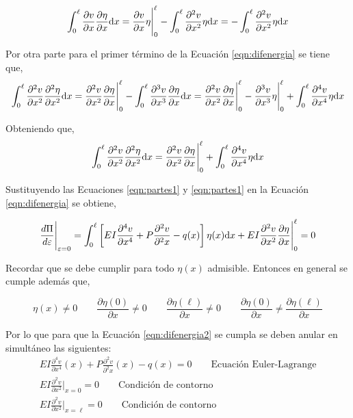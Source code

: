 \begin{equation}\label{eqn:partes1}
\int_0^\ell \frac{\partial v}{\partial x} \frac{\partial \eta}{\partial x}{\text{d}} x = \frac{\partial v}{\partial x}\eta\Bigg|_0^\ell - \int_0^\ell \frac{\partial^2 v}{\partial x^2} \eta{\text{d}} x 
= -\int_0^\ell \frac{\partial^2 v}{\partial x^2} \eta{\text{d}} x
\end{equation}

Por otra parte para el primer término de la Ecuación \eqref{eqn:difenergia} se tiene que,
$$
\int_0^\ell \frac{\partial^2 v}{\partial x^2} \frac{\partial^2 \eta}{\partial x^2}{\text{d}} x = \frac{\partial^2 v}{\partial x^2} \frac{\partial \eta}{\partial x}\Bigg|_0^\ell - \int_0^\ell \frac{\partial^3 v}{\partial x^3} \frac{\partial \eta}{\partial x}{\text{d}} x = \frac{\partial^2 v}{\partial x^2} \frac{\partial \eta}{\partial x}\Bigg|_0^\ell - \frac{\partial^3 v}{\partial x^3}\eta\Bigg|_0^\ell + \int_0^\ell \frac{\partial^4 v}{\partial x^4} \eta{\text{d}} x
$$

Obteniendo que,
\begin{equation}\label{eqn:partes2}
\int_0^\ell \frac{\partial^2 v}{\partial x^2} \frac{\partial^2 \eta}{\partial x^2}{\text{d}} x = \frac{\partial^2 v}{\partial x^2} \frac{\partial \eta}{\partial x}\Bigg|_0^\ell + \int_0^\ell \frac{\partial^4 v}{\partial x^4} \eta {\text{d}} x
\end{equation}

Sustituyendo las Ecuaciones \eqref{eqn:partes1} y \eqref{eqn:partes1} en la Ecuación \eqref{eqn:difenergia} se obtiene,

\begin{equation}\label{eqn:difenergia2}
\frac{d\Pi}{d\varepsilon} \Bigg|_{\varepsilon=0} = \int_0^\ell \left[ EI \frac{\partial^4 v}{\partial x^4} + P \frac{\partial^2 v}{\partial^2 x} - q(x)  \right] \eta(x) {\text{d}} x + EI\frac{\partial^2 v}{\partial x^2} \frac{\partial \eta}{\partial x}\Bigg|_0^\ell = 0
\end{equation}

Recordar que se debe cumplir para todo $\eta(x)$ admisible. Entonces en general se cumple además que, 

$$
\eta(x)\neq0 
\qquad
\frac{\partial \eta(0)}{\partial x} \neq 0
\qquad
\frac{\partial \eta(\ell)}{\partial x} \neq 0
\qquad 
\frac{\partial \eta(0)}{\partial x} \neq \frac{\partial \eta(\ell)}{\partial x}
$$

Por lo que para que la Ecuación \eqref{eqn:difenergia2} se cumpla se deben anular en simultáneo las siguientes:
\begin{eqnarray}
EI \frac{\partial^4 v}{\partial x^4}(x) + P \frac{\partial^2 v}{\partial^2 x}(x) - q(x) = 0 \qquad \text{Ecuación Euler-Lagrange} \label{eqn:euler} \\
EI\frac{\partial^2 v}{\partial x^2}\Bigg|_{x=0}=0 \qquad \text{Condición de contorno} \label{eqn:contorno1} \\
EI\frac{\partial^2 v}{\partial x^2}\Bigg|_{x=\ell}=0 \qquad \text{Condición de contorno} \label{eqn:contorno2}
\end{eqnarray}

